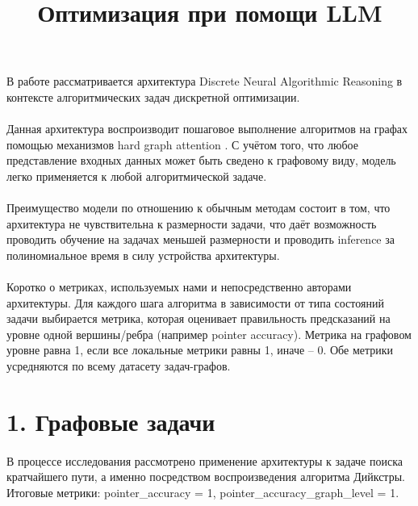 \documentclass{article}
\title{\textbf{Оптимизация при помощи LLM}}
\date{}
\begin{document}
\maketitle
\begin{flushleft}
\paragraph{}
В работе рассматривается архитектура Discrete Neural Algorithmic Reasoning \cite{rodionov2025discreteneuralalgorithmicreasoning} в контексте алгоритмических задач дискретной оптимизации. 
\paragraph{}
Данная архитектура воспроизводит пошаговое выполнение алгоритмов на графах помощью механизмов hard graph attention \cite{rodionov2025discreteneuralalgorithmicreasoning}. С учётом того, что любое представление входных данных может быть сведено к графовому виду, модель легко применяется к любой алгоритмической задаче. 
\paragraph{}
Преимущество модели по отношению к обычным методам состоит в том, что архитектура не чувствительна к размерности задачи, что даёт возможность проводить обучение на задачах меньшей размерности и проводить inference за полиномиальное время в силу устройства архитектуры.

\paragraph{}
Коротко о метриках, используемых нами и непосредственно авторами архитектуры. Для каждого шага алгоритма в зависимости от типа состояний задачи выбирается метрика, которая оценивает правильность предсказаний на уровне одной вершины/ребра (например pointer accuracy). Метрика на графовом уровне равна 1, если все локальные метрики равны 1, иначе -- 0. Обе метрики усредняются по всему датасету задач-графов.
\section*{1. Графовые задачи}
\paragraph{}{В процессе исследования рассмотрено применение архитектуры к задаче поиска кратчайшего пути, а именно посредством воспроизведения алгоритма Дийкстры. Итоговые метрики: pointer\_accuracy = 1, pointer\_accuracy\_graph\_level = 1.}

\end{flushleft}
\end{document}
